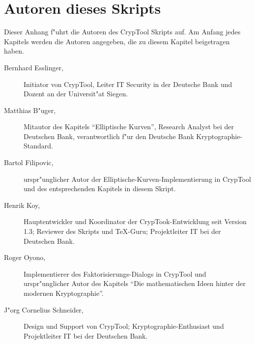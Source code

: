 \section{Autoren dieses Skripts}
\hypertarget{appendix-authors}{}\label{s:appendix-authors}

Dieser Anhang f"uhrt die Autoren des CrypTool Skripts auf. Am Anfang jedes
Kapitels werden die Autoren angegeben, die zu diesem Kapitel beigetragen haben.

\begin{description}
\item[Bernhard Esslinger,] Initiator von CrypTool, Leiter IT Security in der Deutsche
Bank und Dozent an der Universit"at Siegen.
 
\item[Matthias B"uger,] Mitautor des Kapitels ``Elliptische Kurven'',
Research Analyst bei der Deutschen Bank, verantwortlich f"ur den Deutsche Bank
Kryptographie-Standard.

\item[Bartol Filipovic,] urspr"unglicher Autor der
Elliptische-Kurven-Implementierung in CrypTool und des entsprechenden Kapitels
in diesem Skript.

\item[Henrik Koy, ] Hauptentwickler und Koordinator der CrypTook-Entwicklung
seit Version 1.3; Reviewer des Skripts und \TeX{}-Guru; Projektleiter IT bei der
Deutschen Bank.

\item[Roger Oyono, ] Implementierer des Faktorisierungs-Dialogs in CrypTool und urspr"unglicher Autor des Kapitels "`Die mathematischen Ideen hinter der modernen Kryptographie"'.

\item[J"org Cornelius Schneider,] Design und Support von CrypTool;
Kryptographie-Enthusiast und Projektleiter IT bei der Deutschen Bank.

\end{description}

